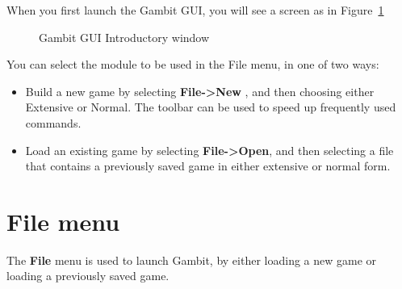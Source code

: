 \documentclass[12pt]{report}
\begin{document}
When you first launch the Gambit GUI, you will see a screen as in
Figure~\ref{fig_gamgui}

\begin{figure}
\caption{Gambit GUI Introductory window}\label{fig_gamgui}
\end{figure}

You can select the module to be used in the File menu,
in one of two ways:

\begin{itemize}
\item Build a new game by selecting {\bf File->New} , and then
choosing either Extensive or Normal.  The toolbar can be used to speed
up frequently used commands.
\item Load an existing game by selecting {\bf File->Open}, and then
selecting a file that contains a previously saved game in either
extensive or normal form.
\end{itemize}

\section{File menu}

The {\bf File} menu is used to launch Gambit, by either loading a new
game or loading a previously saved game.
\end{document}
